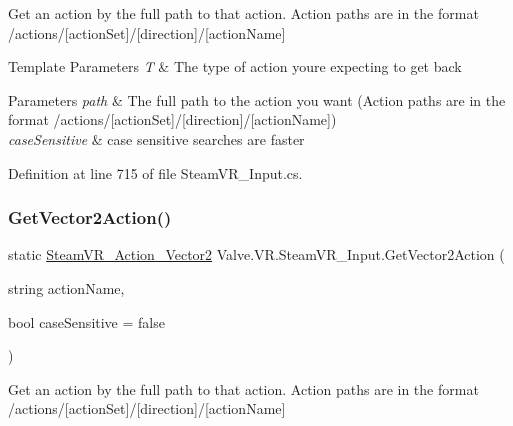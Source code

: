 Get an action by the full path to that action. Action paths are in the format /actions/\mbox{[}action\+Set\mbox{]}/\mbox{[}direction\mbox{]}/\mbox{[}action\+Name\mbox{]} 


\begin{DoxyTemplParams}{Template Parameters}
{\em T} & The type of action you\textquotesingle{}re expecting to get back\\
\hline
\end{DoxyTemplParams}

\begin{DoxyParams}{Parameters}
{\em path} & The full path to the action you want (Action paths are in the format /actions/\mbox{[}action\+Set\mbox{]}/\mbox{[}direction\mbox{]}/\mbox{[}action\+Name\mbox{]})\\
\hline
{\em case\+Sensitive} & case sensitive searches are faster\\
\hline
\end{DoxyParams}


Definition at line 715 of file Steam\+V\+R\+\_\+\+Input.\+cs.

\mbox{\label{class_valve_1_1_v_r_1_1_steam_v_r___input_abb8ad8e823781ceec0aac7ebc7db1125}} 
\subsubsection{\texorpdfstring{GetVector2Action()}{GetVector2Action()}\hspace{0.1cm}{\footnotesize\ttfamily [2/2]}}
{\footnotesize\ttfamily static \mbox{\hyperlink{class_valve_1_1_v_r_1_1_steam_v_r___action___vector2}{Steam\+V\+R\+\_\+\+Action\+\_\+\+Vector2}} Valve.\+V\+R.\+Steam\+V\+R\+\_\+\+Input.\+Get\+Vector2\+Action (\begin{DoxyParamCaption}\item[{string}]{action\+Name,  }\item[{bool}]{case\+Sensitive = {\ttfamily false} }\end{DoxyParamCaption})\hspace{0.3cm}{\ttfamily [static]}}



Get an action by the full path to that action. Action paths are in the format /actions/\mbox{[}action\+Set\mbox{]}/\mbox{[}direction\mbox{]}/\mbox{[}action\+Name\mbox{]} 


